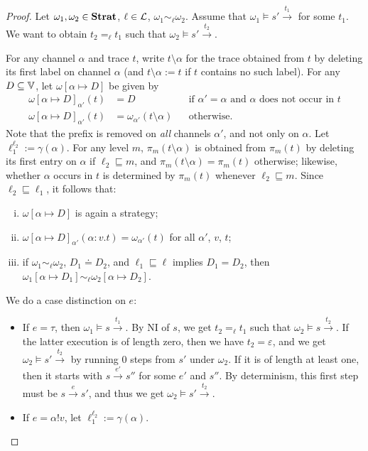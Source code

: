 \documentclass[preprint,5p,twocolumn]{elsarticle}
\begin{document}
\begin{proof}
  Let $\omega_1, \omega_2 \in \mathbf{Strat}$, $\ell \in \mathcal{L}$, $\omega_1 \sim_\ell \omega_2$.
  Assume that $\omega_1 \vDash s' \xrightarrow{t_1}$ for some $t_1$. We want to obtain
  $t_2 =_\ell t_1$ such that  $\omega_2 \vDash s' \xrightarrow{t_2}$.

  For any channel $\alpha$ and trace $t$, write $t \setminus \alpha$ for the trace obtained from $t$
  by deleting its first label on channel $\alpha$ (and $t \setminus \alpha := t$ if $t$ contains no
  such label). For any $D \subseteq \mathbb{V}$, let $\omega[\alpha \mapsto D]$ be given by
  \begin{align*}
    {\omega[\alpha \mapsto D]}_{\alpha'}(t) &= D && \text{if } \alpha' = \alpha \text{ and } \alpha \text{ does not occur in } t\\
    {\omega[\alpha \mapsto D]}_{\alpha'}(t) &= {\omega}_{\alpha'}(t \setminus \alpha) && \text{otherwise.}
  \end{align*}
  Note that the prefix is removed on \emph{all} channels $\alpha'$, and not only on $\alpha$.
  Let $\ell_1^{\ell_2} := \gamma(\alpha)$. For any level $m$, $\pi_m(t \setminus \alpha)$ is obtained
  from $\pi_m(t)$ by deleting its first entry on $\alpha$ if $\ell_2 \sqsubseteq m$, and
  $\pi_m(t\setminus\alpha) = \pi_m(t)$ otherwise; likewise, whether $\alpha$ occurs in $t$ is
  determined by $\pi_m(t)$ whenever $\ell_2 \sqsubseteq m$. Since $\ell_2 \sqsubseteq \ell_1$, it
  follows that:
  \begin{enumerate}[(i)]
  \item $\omega[\alpha \mapsto D]$ is again a strategy;
  \item ${\omega[\alpha \mapsto D]}_{\alpha'}(\alpha : v.t) = {\omega}_{\alpha'}(t)$ for all $\alpha'$, $v$, $t$;
  \item if $\omega_1 \sim_\ell \omega_2$, $D_1 \doteq D_2$, and $\ell_1 \sqsubseteq \ell$ implies
    $D_1 = D_2$, then $\omega_1[\alpha \mapsto D_1] \sim_\ell \omega_2[\alpha \mapsto D_2]$.
  \end{enumerate}

  We do a case distinction on $e$:
  \begin{itemize}
  \item If $e = \tau$, then $\omega_1 \vDash s \xrightarrow{t_1}$. By NI of $s$, we get $t_2 =_\ell t_1$
    such that $\omega_2 \vDash s \xrightarrow{t_2}$. If the latter execution is of length zero, then we have
    $t_2 = \varepsilon$, and we get $\omega_2 \vDash s' \xrightarrow{t_2}$ by running 0 steps from $s'$
    under $\omega_2$. If it is of length at least one, then it starts with $s \xrightarrow{e'} s''$ for some $e'$
    and $s''$. By determinism, this first step must be $s \xrightarrow{e} s'$, and thus we get
    $\omega_2 \vDash s' \xrightarrow{t_2}$.
  \item If $e = \alpha ! v$, let $\ell_1^{\ell_2} := \gamma(\alpha)$.


\end{itemize}
\end{proof}
\end{document}
